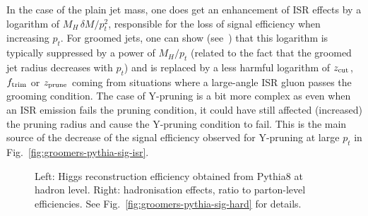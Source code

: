 In the case of the plain jet mass, one does get an enhancement of ISR
effects by a logarithm of $M_H\,\delta M/p_t^2$, responsible for the
loss of signal efficiency when increasing $p_t$.
%
For groomed jets, one can show (see~\cite{Dasgupta:2015yua}) that this
logarithm is typically suppressed by a power of $M_H/p_t$ (related to
the fact that the groomed jet radius decreases with $p_t$) and is
replaced by a less harmful logarithm of $z_{\text{cut}}$, $f_{\text{trim}}$ or $z_{\text{prune}}$
coming from situations where a large-angle ISR gluon passes the
grooming condition.
%
The case of Y-pruning is a bit more complex as even when an ISR
emission fails the pruning condition, it could have still affected
(increased) the pruning radius and cause the Y-pruning condition to
fail.  This is the main source of the decrease of the signal
efficiency observed for Y-pruning at large $p_t$ in
Fig.~\ref{fig:groomers-pythia-sig-isr}.


\begin{figure}
  \hfill%
  \caption{Left: Higgs reconstruction efficiency obtained from
    Pythia8 at hadron level. Right: hadronisation effects, \ie ratio
    to parton-level efficiencies. See
    Fig.~\ref{fig:groomers-pythia-sig-hard} for
    details.}\label{fig:groomers-pythia-sig-hadr}
\end{figure}



